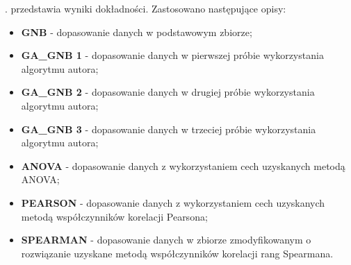 \begin{table}[H]
    \centering
    \label{tab:monday-workingHours}
\end{table}

. przedstawia wyniki dokładności. Zastosowano następujące opisy:
\begin{itemize}
    \item \textbf{GNB} - dopasowanie danych w podstawowym zbiorze;
    \item \textbf{GA\_GNB 1} - dopasowanie danych w pierwszej próbie wykorzystania algorytmu autora;
    \item \textbf{GA\_GNB 2} - dopasowanie danych w drugiej próbie wykorzystania algorytmu autora;
    \item \textbf{GA\_GNB 3} - dopasowanie danych w trzeciej próbie wykorzystania algorytmu autora;
    \item \textbf{ANOVA} - dopasowanie danych z wykorzystaniem cech uzyskanych metodą ANOVA;
    \item \textbf{PEARSON} - dopasowanie danych z wykorzystaniem cech uzyskanych metodą współczynników korelacji Pearsona;
    \item \textbf{SPEARMAN} - dopasowanie danych w zbiorze zmodyfikowanym o rozwiązanie uzyskane metodą  współczynników korelacji rang Spearmana.
\end{itemize}


